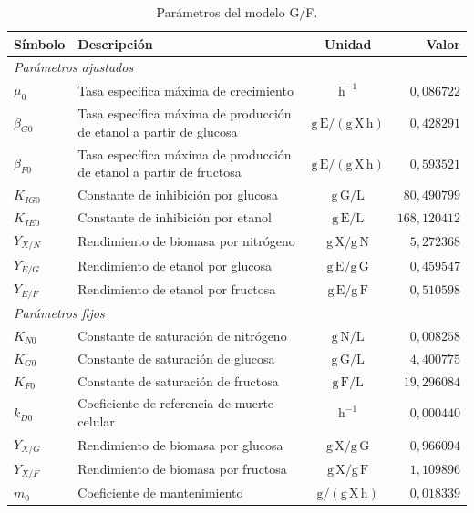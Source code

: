 \begin{table}[H]
  \centering
  \caption{Par\'ametros del modelo G/F.}
  \label{tab:c4-parametros-gf}
  \small
  \setlength{\tabcolsep}{4pt}
  \renewcommand{\arraystretch}{1.05}
  \begin{tabular}{@{}l>{\raggedright\arraybackslash}p{5.8cm}cr@{}}
    \hline
    S\'imbolo & Descripci\'on & Unidad & Valor \\
    \hline
    \multicolumn{4}{l}{\textit{Par\'ametros ajustados}} \\
    \(\mu_0\) & Tasa espec\'ifica m\'axima de crecimiento
      & \(\mathrm{h^{-1}}\) & \(0{,}086722\) \\
    \(\beta_{G0}\) & Tasa espec\'ifica m\'axima de producci\'on
      de etanol a partir de glucosa
      & \(\mathrm{g\,E/(g\,X\,h)}\) & \(0{,}428291\) \\
    \(\beta_{F0}\) & Tasa espec\'ifica m\'axima de producci\'on
      de etanol a partir de fructosa
      & \(\mathrm{g\,E/(g\,X\,h)}\) & \(0{,}593521\) \\
    \(K_{IG0}\) & Constante de inhibici\'on por glucosa
      & \(\mathrm{g\,G/L}\) & \(80{,}490799\) \\
    \(K_{IE0}\) & Constante de inhibici\'on por etanol
      & \(\mathrm{g\,E/L}\) & \(168{,}120412\) \\
    \(Y_{X/N}\) & Rendimiento de biomasa por nitr\'ogeno
      & \(\mathrm{g\,X/g\,N}\) & \(5{,}272368\) \\
    \(Y_{E/G}\) & Rendimiento de etanol por glucosa
      & \(\mathrm{g\,E/g\,G}\) & \(0{,}459547\) \\
    \(Y_{E/F}\) & Rendimiento de etanol por fructosa
      & \(\mathrm{g\,E/g\,F}\) & \(0{,}510598\) \\
    \hline
    \multicolumn{4}{l}{\textit{Par\'ametros fijos}} \\
    \(K_{N0}\) & Constante de saturaci\'on de nitr\'ogeno
      & \(\mathrm{g\,N/L}\) & \(0{,}008258\) \\
    \(K_{G0}\) & Constante de saturaci\'on de glucosa
      & \(\mathrm{g\,G/L}\) & \(4{,}400775\) \\
    \(K_{F0}\) & Constante de saturaci\'on de fructosa
      & \(\mathrm{g\,F/L}\) & \(19{,}296084\) \\
    \(k_{D0}\) & Coeficiente de referencia de muerte celular
      & \(\mathrm{h^{-1}}\) & \(0{,}000440\) \\
    \(Y_{X/G}\) & Rendimiento de biomasa por glucosa
      & \(\mathrm{g\,X/g\,G}\) & \(0{,}966094\) \\
    \(Y_{X/F}\) & Rendimiento de biomasa por fructosa
      & \(\mathrm{g\,X/g\,F}\) & \(1{,}109896\) \\
    \(m_0\) & Coeficiente de mantenimiento
      & \(\mathrm{g/(g\,X\,h)}\) & \(0{,}018339\) \\
    \hline
  \end{tabular}
\end{table}
